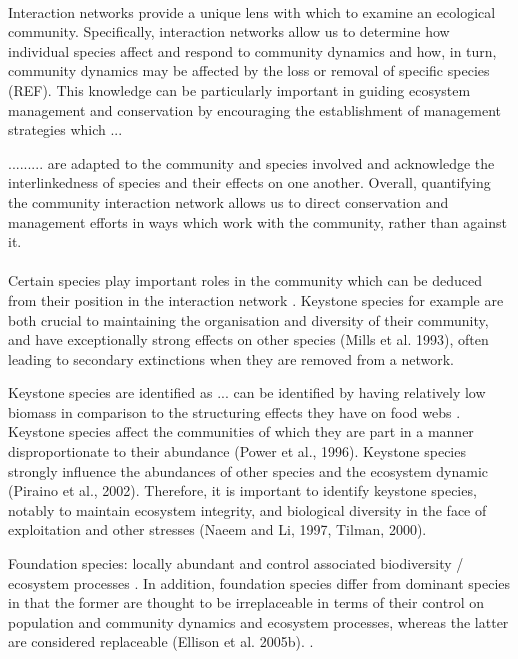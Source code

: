 \documentclass[a4,12pt]{article}
\begin{document}
        \paragraph{}
        Interaction networks provide a unique lens with which to examine an ecological community. Specifically, interaction networks allow us to determine how individual species affect and respond to community dynamics and how, in turn, community dynamics may be affected by the loss or removal of specific species (REF). This knowledge can be particularly important in guiding ecosystem management and conservation by encouraging  the establishment of management strategies which ...

        ......... are adapted to the community and species involved and acknowledge the interlinkedness of species and their effects on one another. 
        Overall, quantifying the community interaction network allows us to direct conservation and management efforts in ways which work with the community, rather than against it.


        \paragraph{}
        Certain species play important roles in the community which can be deduced from their position in the interaction network \citep{Cirtwill2018a}. Keystone species for example are both crucial to maintaining the organisation and diversity of their community, and have exceptionally strong effects on other species (Mills et al. 1993), often leading to secondary extinctions when they are removed from a network. 

        Keystone species are identified as ... can be identified by having relatively low biomass in comparison to the structuring effects they have on food webs \citep{Libralato2006}. 
        Keystone species affect the communities of which they are part in a manner disproportionate to their abundance (Power et al., 1996). Keystone species strongly influence the abundances of other species and the ecosystem dynamic (Piraino et al., 2002). Therefore, it is important to identify keystone species, notably to maintain ecosystem integrity, and biological diversity in the face of exploitation and other stresses (Naeem and Li, 1997, Tilman, 2000).

        Foundation species: locally abundant and control associated biodiversity / ecosystem processes \citep{Baiser2013}. In addition, foundation species differ from dominant species in that the former are thought to be irreplaceable in terms of their control on population and community dynamics and ecosystem processes, whereas the latter are considered replaceable (Ellison et al. 2005b). \citep{Ellison2005}.
\end{document}
